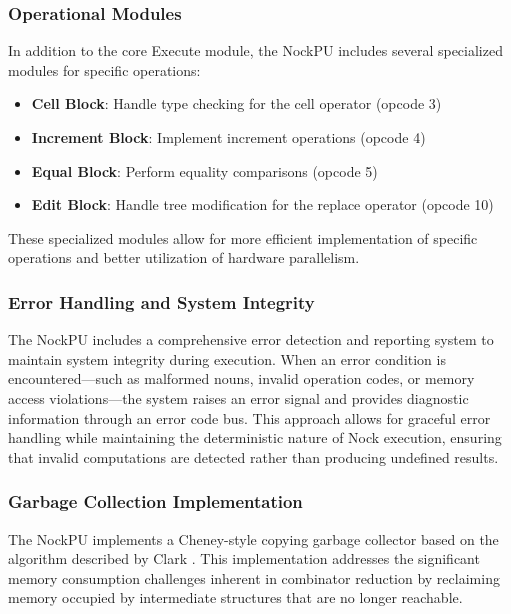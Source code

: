 \documentclass[twoside]{article}
\begin{document}
\subsubsection{Operational Modules}

In addition to the core Execute module, the NockPU includes several specialized modules for specific operations:

\begin{itemize}
  \item \textbf{Cell Block}: Handle type checking for the cell operator (opcode 3)
  \item \textbf{Increment Block}: Implement increment operations (opcode 4)
  \item \textbf{Equal Block}: Perform equality comparisons (opcode 5)
  \item \textbf{Edit Block}: Handle tree modification for the replace operator (opcode 10)
\end{itemize}

\noindent
These specialized modules allow for more efficient implementation of specific operations and better utilization of hardware parallelism.

\subsubsection{Error Handling and System Integrity}

The NockPU includes a comprehensive error detection and reporting system to maintain system integrity during execution. When an error condition is encountered—such as malformed nouns, invalid operation codes, or memory access violations—the system raises an error signal and provides diagnostic information through an error code bus. This approach allows for graceful error handling while maintaining the deterministic nature of Nock execution, ensuring that invalid computations are detected rather than producing undefined results.

\subsubsection{Garbage Collection Implementation}

The NockPU implements a Cheney-style copying garbage collector based on the algorithm described by Clark \citep{Clark1976}. This implementation addresses the significant memory consumption challenges inherent in combinator reduction by reclaiming memory occupied by intermediate structures that are no longer reachable.
\end{document}
